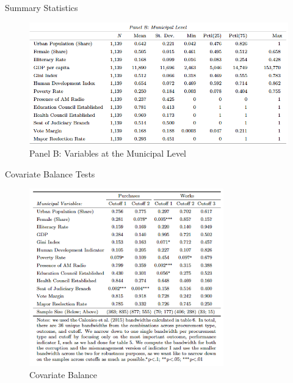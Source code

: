 \documentclass[10pt,ignorenonframetext,]{beamer}
\begin{document}
\begin{frame}{Summary Statistics}
\protect\hypertarget{summary-statistics-1}{}

\begin{figure}
\centering
\includegraphics{./images/panelB.png}
\caption{Panel B: Variables at the Municipal Level}
\end{figure}

\end{frame}

\begin{frame}{Covariate Balance Tests}
\protect\hypertarget{covariate-balance-tests}{}

\begin{figure}
\centering
\includegraphics[width=0.75\textwidth,height=\textheight]{./images/covariates.png}
\caption{Covariate Balance}
\end{figure}

\end{frame}
\end{document}

